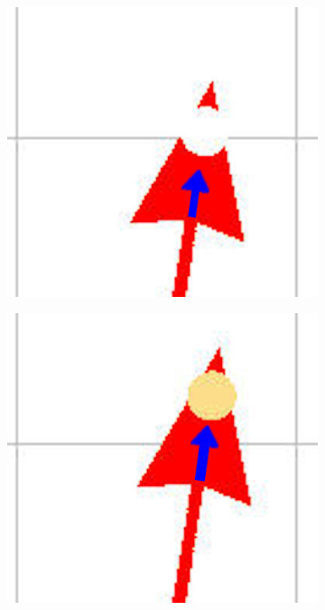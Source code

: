 \documentclass[eind]{penoverslag}
\begin{document}
\begin{figure}
        \centering
        \begin{subfigure}[hb]{0.2\textwidth}
                \centering
                \includegraphics[width=\textwidth]{witte_lijn1}
        \end{subfigure}%
        \begin{subfigure}[hb]{0.2\textwidth}
                \centering
                \includegraphics[width=\textwidth]{witte_lijn2}

\end{subfigure}
\end{figure}
\end{document}
